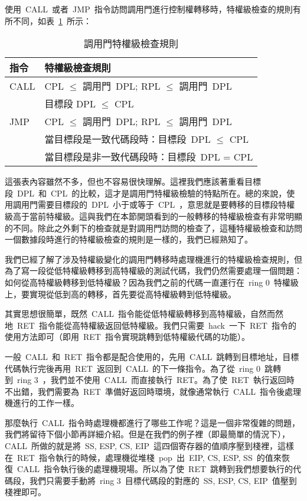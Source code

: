使用~CALL~或者~JMP~指令訪問調用門進行控制權轉移時，特權級檢查的規則有所不同，如表~\ref{callgate_rules}~所示：

\begin{center}\begin{longtable}{|l|l|}
\caption[]{調用門特權級檢查規則}\label{callgate_rules}\\
\hline
\textbf{指令} & \textbf{特權級檢查規則}\\
\hline
CALL & CPL $\le$ 調用門~DPL; RPL $\le$ 調用門~DPL\\
     & 目標段 DPL $\le$ CPL\\
\hline
JMP  & CPL $\le$ 調用門~DPL; RPL $\le$ 調用門~DPL\\
     & 當目標段是一致代碼段時：目標段~DPL $\le$ CPL\\
     & 當目標段是非一致代碼段時：目標段~DPL = CPL\\
\hline
\end{longtable}\end{center}

這張表內容雖然不多，但也不容易很快理解。這裡我們應該著重看目標段~DPL~和~CPL~的比較，這才是調用門特權級檢驗的特點所在。總的來說，使用調用門需要目標段的~DPL~小于或等于~CPL~，意思就是要轉移的目標段特權級高于當前特權級。這與我們在本節開頭看到的一般轉移的特權級檢查有非常明顯的不同。除此之外剩下的檢查就是對調用門訪問的檢查了，這種特權級檢查和訪問一個數據段時進行的特權級檢查的規則是一樣的，我們已經熟知了。

我們已經了解了涉及特權級變化的調用門轉移時處理機進行的特權級檢查規則，但為了寫一段從低特權級轉移到高特權級的測試代碼，我們仍然需要處理一個問題：如何從高特權級轉移到低特權級？因為我們之前的代碼一直運行在~ring 0~特權級上，要實現從低到高的轉移，首先要從高特權級轉到低特權級。

其實思想很簡單，既然~CALL~指令能從低特權級轉移到高特權級，自然而然地~RET~指令能從高特權級返回低特權級。我們只需要~hack~一下~RET~指令的使用方法即可（即用~RET~指令實現跳轉到低特權級代碼的功能）。

一般~CALL~和~RET~指令都是配合使用的，先用~CALL~跳轉到目標地址，目標代碼執行完後再用~RET~返回到~CALL~的下一條指令。為了從~ring 0~跳轉到~ring 3~，我們並不使用~CALL~而直接執行~RET。為了使~RET~執行返回時不出錯，我們需要為~RET~準備好返回時環境，就像通常執行~CALL~指令後處理機進行的工作一樣。

那麼執行~CALL~指令時處理機都進行了哪些工作呢？這是一個非常復雜的問題，我們將留待下個小節再詳細介紹。但是在我們的例子裡（即最簡單的情況下），CALL~所做的就是將~SS, ESP, CS, EIP~這四個寄存器的值順序壓到棧裡，這樣在~RET~指令執行的時候，處理機從堆棧~pop~出~EIP, CS, ESP, SS~的值來恢復~CALL~指令執行後的處理機現場。所以為了使~RET~跳轉到我們想要執行的代碼段，我們只需要手動將~ring 3~目標代碼段的對應的~SS, ESP, CS, EIP~值壓到棧裡即可。

